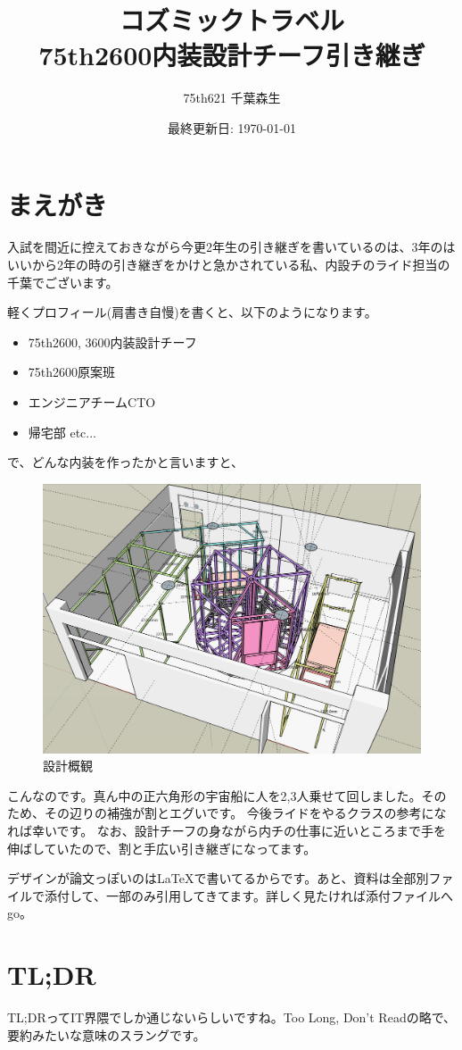 \documentclass{jsarticle}
\title{
    コズミックトラベル \\
    \large 75th2600内装設計チーフ引き継ぎ
}
\author{75th621 千葉森生}
\date{最終更新日: \today}
\makeatletter
\newenvironment{imageHere}[2][htbp]{\def\@imageHereTmp{#2}%
    \begin{figure}[#1]
        \centering
}{%
        \caption{\@imageHereTmp}
        \label{fig:\@imageHereTmp}
    \end{figure}
}
\makeatother
\begin{document}
\maketitle

\section{まえがき}

入試を間近に控えておきながら今更2年生の引き継ぎを書いているのは、3年のはいいから2年の時の引き継ぎをかけと急かされている私、内設チのライド担当の千葉でございます。

軽くプロフィール(肩書き自慢)を書くと、以下のようになります。
\begin{itemize}
    \item 75th2600, 3600内装設計チーフ
    \item 75th2600原案班
    \item エンジニアチームCTO
    \item 帰宅部 etc...
\end{itemize}

で、どんな内装を作ったかと言いますと、

\begin{imageHere}{設計概観}
    \includegraphics[width=0.5\linewidth]{images/plan_overview/1.png}
\end{imageHere}

こんなのです。真ん中の正六角形の宇宙船に人を2,3人乗せて回しました。そのため、その辺りの補強が割とエグいです。
今後ライドをやるクラスの参考になれば幸いです。
なお、設計チーフの身ながら内チの仕事に近いところまで手を伸ばしていたので、割と手広い引き継ぎになってます。

デザインが論文っぽいのは\LaTeX{}で書いてるからです。あと、資料は全部別ファイルで添付して、一部のみ引用してきてます。詳しく見たければ添付ファイルへgo。

\clearpage

\tableofcontents

\section{TL;DR}
TL;DRってIT界隈でしか通じないらしいですね。Too Long, Don't Readの略で、要約みたいな意味のスラングです。
\end{document}
